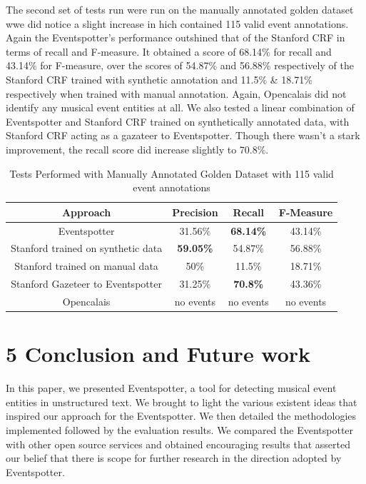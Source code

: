 \documentclass[a4paper,11pt]{report}
\begin{document}
The second set of tests run were run on the manually annotated golden dataset wwe did notice a slight increase in hich contained 115 valid event annotations. Again the Eventspotter's performance outshined that of the Stanford CRF in terms of recall and F-measure. It obtained a score of 68.14\% for recall and 43.14\% for F-measure, over the scores of 54.87\% and 56.88\% respectively of the Stanford CRF trained with synthetic annotation and 11.5\% & 18.71\% respectively when trained with manual annotation. Again, Opencalais did not identify any musical event entities at all. We also tested a linear combination of Eventspotter and Stanford CRF trained on synthetically annotated data, with Stanford CRF acting as a gazateer to Eventspotter. Though there wasn't a stark improvement, the recall score did increase slightly to 70.8\%.
\begin{table}[ht]
\caption{Tests Performed with Manually Annotated Golden Dataset with 115 valid event annotations} %
\centering %
\begin{tabular}{c c c c} %
\hline\hline %
Approach & Precision & Recall & F-Measure \\ [0.5ex] %
\hline %
Eventspotter & 31.56\% & \bf 68.14\% \bf & 43.14\% \\
Stanford trained on synthetic data & \bf 59.05\% \bf & 54.87\% & 56.88\%\\
Stanford trained on manual data & 50\% & 11.5\% & 18.71\% \\
Stanford Gazeteer to Eventspotter & 31.25\% & \bf 70.8\% \bf & 43.36\% \\
Opencalais & no events & no events & no events \\
\hline %
\end{tabular}
\label{table:nonlin} %
\end{table}

\chapter*{5 Conclusion and Future work}

In this paper, we presented Eventspotter, a tool for detecting musical event entities in unstructured text. We brought to light the various existent ideas that inspired our approach for the Eventspotter. We then detailed the methodologies implemented followed by the evaluation results. We compared the Eventspotter with other open source services and obtained encouraging results that asserted our belief that there is scope for further research in the direction adopted by Eventspotter.
\end{document}
